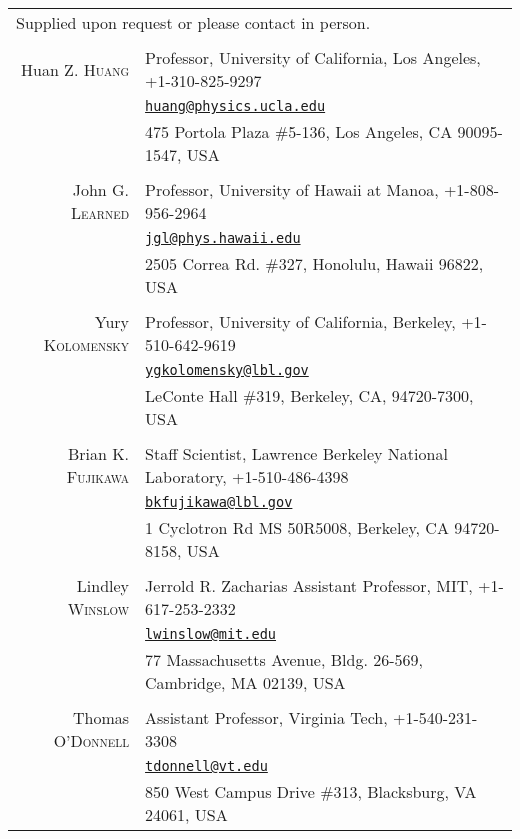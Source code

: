 \documentclass[10pt]{article} %
\begin{document}
\noindent\begin{tabular}{rp{12cm}}
\multicolumn{2}{l}{\footnotesize{Supplied upon request or please contact in
	person.}}\\
\multicolumn{2}{c}{}\\

Huan Z. \textsc{Huang} & Professor, University of California, Los Angeles, +1-310-825-9297\\
& \href{mailto:huang@physics.ucla.edu}{\nolinkurl{huang@physics.ucla.edu}}\\
& 475 Portola Plaza \#5-136, Los Angeles, CA 90095-1547, USA\\
\\
John G. \textsc{Learned} & Professor, University of Hawaii at Manoa, +1-808-956-2964\\
& \href{mailto:jgl@phys.hawaii.edu}{\nolinkurl{jgl@phys.hawaii.edu}}\\
& 2505 Correa Rd. \#327, Honolulu, Hawaii 96822, USA\\
\\
Yury \textsc{Kolomensky} & Professor, University of California, Berkeley, +1-510-642-9619\\
& \href{mailto:ygkolomensky@lbl.gov}{\nolinkurl{ygkolomensky@lbl.gov}}\\
& LeConte Hall \#319, Berkeley, CA, 94720-7300, USA\\
\\
Brian K. \textsc{Fujikawa} & Staff Scientist, Lawrence Berkeley National Laboratory, +1-510-486-4398\\
& \href{mailto:bkfujikawa@lbl.gov}{\nolinkurl{bkfujikawa@lbl.gov}}\\
& 1 Cyclotron Rd MS 50R5008, Berkeley, CA 94720-8158, USA\\
\\
Lindley \textsc{Winslow} & Jerrold R. Zacharias Assistant Professor, MIT, +1-617-253-2332\\
& \href{mailto:lwinslow@mit.edu}{\nolinkurl{lwinslow@mit.edu}}\\ 
& 77 Massachusetts Avenue, Bldg. 26-569, Cambridge, MA 02139, USA\\
\\
Thomas \textsc{O'Donnell} & Assistant Professor, Virginia Tech, +1-540-231-3308\\
& \href{mailto:tdonnell@vt.edu}{\nolinkurl{tdonnell@vt.edu}}\\
& 850 West Campus Drive \#313, Blacksburg, VA 24061, USA\\


\end{tabular}
\end{document}
